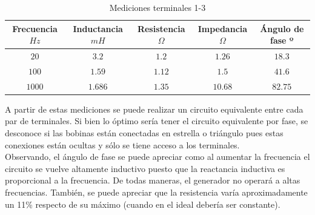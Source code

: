 \documentclass[a4paper,11pt,twoside]{IT-CNEA}
\begin{document}
\begin{table}[h!]
\centering
\caption{Mediciones terminales 1-3}
\label{tabla:bobinas1-3}
\begin{tabular}{|c|c|c|c|c|}
\hline
Frecuencia $Hz$ & Inductancia $mH$ & Resistencia $\varOmega$ & Impedancia $\varOmega$ & Ángulo de fase º \\ \hline 
$20$&$3.2$&$1.2$&$1.26$&$18.3$  \\ \hline
$100$&$1.59$&$1.12$&$1.5$&$41.6$  \\ \hline
$1000$&$1.686$&$1.35$&$10.68$&$82.75$  \\ \hline
\end{tabular}
\end{table}
\par A partir de estas mediciones se puede realizar un circuito equivalente entre cada par de terminales. Si bien lo óptimo sería tener el circuito equivalente por fase, se desconoce si las bobinas están conectadas en estrella o triángulo pues estas conexiones están ocultas y sólo se tiene acceso a los terminales. 
\\ Observando, el ángulo de fase se puede apreciar como al aumentar la frecuencia el circuito se vuelve altamente inductivo puesto que la reactancia inductiva es proporcional a la frecuencia. De todas maneras, el generador no operará a altas frecuencias. También, se puede apreciar que la resistencia varía aproximadamente un 11\% respecto de su máximo (cuando en el ideal debería ser constante). 
\end{document}
